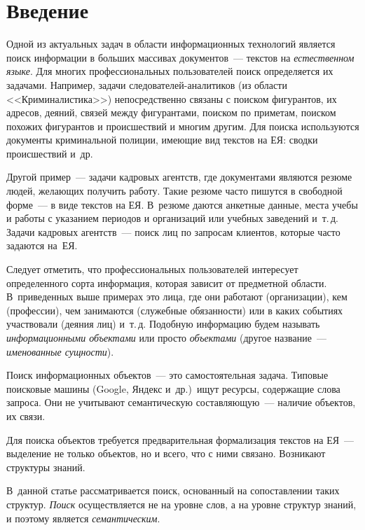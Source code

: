       \begin{multicols}{2}

            \label{st\stat}
    
    \section{Введение}
    
    Одной из актуальных задач в области информационных технологий 
является поиск информации в больших массивах документов~--- текстов на 
\textit{естественном языке}. Для многих профессиональных 
пользователей поиск определяется их задачами. Например, задачи 
следователей-аналитиков (из области <<Криминалистика>>) непосредственно 
связаны с поиском фигурантов, их адресов, деяний, связей между фигурантами, 
поиском по приметам, поиском похожих фигурантов и происшествий и многим 
другим. Для поиска используются документы криминальной полиции, 
имеющие вид текстов на ЕЯ: сводки происшествий и~др.
    
    Другой пример~--- задачи кадровых агентств, где документами являются 
резюме людей, желающих получить работу. Такие резюме часто пишутся в 
свободной форме~--- в виде текстов на ЕЯ. В~резюме даются анкетные данные, 
места учебы и работы с указанием периодов и организаций или учебных 
заведений и~т.\,д. Задачи кадровых агентств~--- поиск лиц по запросам 
клиентов, которые часто задаются на~ЕЯ.
    
    Следует отметить, что профессиональных пользователей интересует 
определенного сорта информация, которая зависит от предметной области. 
В~приведенных выше примерах это лица, где они работают (организации), кем 
(профессии), чем занимаются (служебные обязанности) или в каких событиях 
участвовали (деяния лиц) и~т.\,д. Подобную информацию будем называть 
\textit{информационными объектами} или просто \textit{объектами} (другое 
название~--- \textit{именованные сущности}).
    
    Поиск информационных объектов~--- это самостоятельная задача. 
Типовые поисковые машины ({Google}, Яндекс и~др.)\ ищут ресурсы, 
содержащие слова запроса. Они не учитывают семантическую 
    составляющую~--- наличие объектов, их связи.
    
    Для поиска объектов требуется предварительная формализация текстов на 
ЕЯ~--- выделение не только объектов, но и всего, что с ними связано. 
Возникают структуры знаний. 

В~данной статье рассматривается поиск, 
основанный на сопоставлении таких структур. \textit{Поиск} осуществляется не 
на уровне слов, а на уровне структур знаний, и поэтому является 
\textit{семантическим}.
    

\end{multicols}
